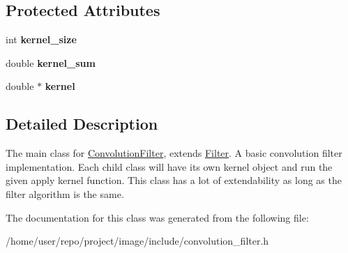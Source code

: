 \subsection*{Protected Attributes}
\begin{DoxyCompactItemize}
\item 
\mbox{\label{classConvolutionFilter_aece66da70dad07df42e28623a5f6074d}} 
int {\bfseries kernel\+\_\+size}
\item 
\mbox{\label{classConvolutionFilter_a9ee9eaa3837d893ad7b304219511d8e5}} 
double {\bfseries kernel\+\_\+sum}
\item 
\mbox{\label{classConvolutionFilter_a57740ec890c05384b20d4a7ba17b4513}} 
double $\ast$ {\bfseries kernel}
\end{DoxyCompactItemize}


\subsection{Detailed Description}
The main class for \hyperlink{classConvolutionFilter}{Convolution\+Filter}, extends \hyperlink{classFilter}{Filter}. A basic convolution filter implementation. Each child class will have it\textquotesingle{}s own kernel object and run the given apply kernel function. This class has a lot of extendability as long as the filter algorithm is the same. 

The documentation for this class was generated from the following file\+:\begin{DoxyCompactItemize}
\item 
/home/user/repo/project/image/include/convolution\+\_\+filter.\+h\end{DoxyCompactItemize}
